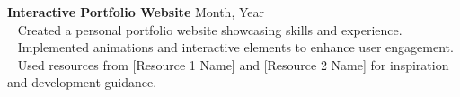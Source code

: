 {\textbf{Interactive Portfolio Website}} \hfill {Month, Year} \\
\hspace*{4pt} \textbullet~ Created a personal portfolio website showcasing skills and experience.\\
\hspace*{4pt} \textbullet~ Implemented animations and interactive elements to enhance user engagement.\\
\hspace*{4pt} \textbullet~ Used resources from [Resource 1 Name] and [Resource 2 Name] for inspiration and development guidance.\\[4pt]


